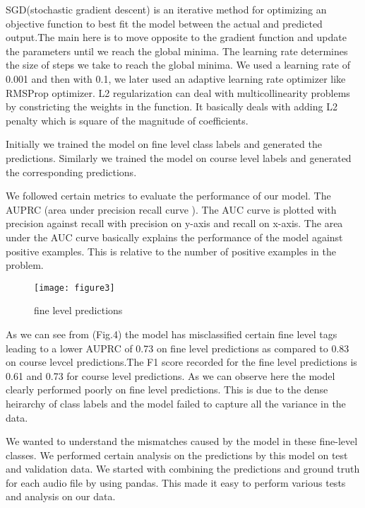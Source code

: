     SGD(stochastic gradient descent) is an iterative method for optimizing an objective function to best fit the model between the actual and predicted output.The main here is to move opposite to the gradient function and update the parameters until we reach the global minima. The learning rate determines the size of steps we take to reach the global minima. We used a learning rate of 0.001 and then with 0.1, we later used an adaptive learning rate optimizer like RMSProp optimizer.
    L2 regularization can deal with multicollinearity problems by constricting the weights in the function. It basically deals with adding L2 penalty which is square of the magnitude of coefficients.
    
    Initially we trained the model on fine level class labels and generated the predictions. Similarly we trained the model on course level labels and generated the corresponding predictions. 
    
    We followed certain metrics to evaluate the performance of our model. The AUPRC (area under precision recall curve ). The AUC curve is plotted with precision against recall with precision on y-axis and recall on x-axis. The area under the AUC curve basically explains the performance of the model against positive examples. This is relative to the number of positive examples in the problem.
    	\begin{figure}[h!]
    	\texttt{[image: figure3]}
    	\caption{fine level predictions}
    \end{figure}
   
    
    As we can see from (Fig.4) the model has misclassified certain fine level tags leading to a lower AUPRC of 0.73 on fine level predictions as compared to 0.83 on course levcel predictions.The F1 score recorded for the fine level predictions is 0.61 and 0.73 for course level predictions. As we can observe here the model clearly performed poorly on fine level predictions. This is due to the dense heirarchy of class labels and the model failed to capture all the variance in the data.
    
    We wanted to understand the mismatches caused by the model in these fine-level classes. We performed certain analysis on the predictions by this model on test and validation data. We started with combining the predictions and ground truth for each audio file by using pandas. This made it easy to perform various tests and analysis on our data.
    
   

	
	
